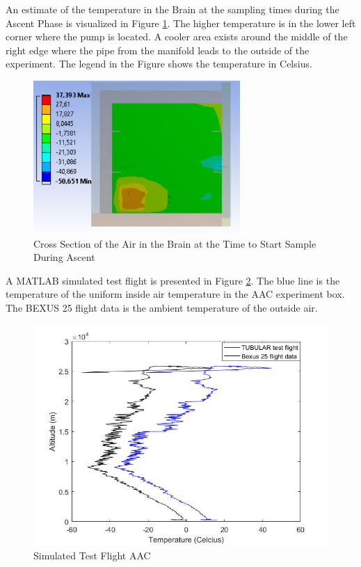 An estimate of the temperature in the Brain at the sampling times during the Ascent Phase is visualized in Figure \ref{fig:Air-in-brain-4-6}. The higher temperature is in the lower left corner where the pump is located. A cooler area exists around the middle of the right edge where the pipe from the manifold leads to the outside of the experiment. The legend in the Figure shows the temperature in Celsius.

\begin{figure}[H]
    \centering
    \includegraphics[width=0.7\textwidth]{4-experiment-design/img/Thermal/air-sampling-with-box}
    \caption{Cross Section of the Air in the Brain at the Time to Start Sample During Ascent}
    \label{fig:Air-in-brain-4-6}
\end{figure}

A MATLAB simulated test flight is presented in Figure \ref{fig:test-flight-AAC-4-6}. The blue line is the temperature of the uniform inside air temperature in the AAC experiment box. The BEXUS 25 flight data is the ambient temperature of the outside air.
\begin{figure}[H]
    \centering
    \includegraphics[width=\textwidth]{4-experiment-design/img/Thermal/AAC-test-flight.jpg}
    \caption{Simulated Test Flight AAC}
    \label{fig:test-flight-AAC-4-6}
\end{figure}

